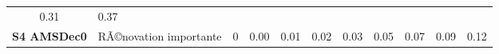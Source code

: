 \documentclass[]{article}
\begin{document}
\begin{longtable}[]{@{}clrrrrrrrrr@{}}
\begin{minipage}[t]{0.05\columnwidth}
0.31\strut
\end{minipage} & \begin{minipage}[t]{0.05\columnwidth}\raggedleft\strut
0.37\strut
\end{minipage}\tabularnewline
\begin{minipage}[t]{0.12\columnwidth}\centering\strut
\textbf{S4 AMSDec0}\strut
\end{minipage} & \begin{minipage}[t]{0.17\columnwidth}\raggedright\strut
RÃ©novation importante\strut
\end{minipage} & \begin{minipage}[t]{0.05\columnwidth}\raggedleft\strut
0\strut
\end{minipage} & \begin{minipage}[t]{0.05\columnwidth}\raggedleft\strut
0.00\strut
\end{minipage} & \begin{minipage}[t]{0.05\columnwidth}\raggedleft\strut
0.01\strut
\end{minipage} & \begin{minipage}[t]{0.05\columnwidth}\raggedleft\strut
0.02\strut
\end{minipage} & \begin{minipage}[t]{0.05\columnwidth}\raggedleft\strut
0.03\strut
\end{minipage} & \begin{minipage}[t]{0.05\columnwidth}\raggedleft\strut
0.05\strut
\end{minipage} & \begin{minipage}[t]{0.05\columnwidth}\raggedleft\strut
0.07\strut
\end{minipage} & \begin{minipage}[t]{0.05\columnwidth}\raggedleft\strut
0.09\strut
\end{minipage} & \begin{minipage}[t]{0.05\columnwidth}\raggedleft\strut
0.12\strut
\end{minipage}\tabularnewline
\bottomrule
\end{longtable}
\end{document}
